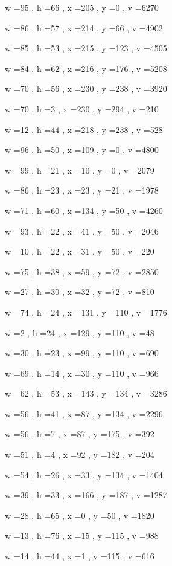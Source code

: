 \documentclass[11pt]{article}
\begin{document}
w =95 , h =66 , x =205 , y =0 , v =6270
\par
w =86 , h =57 , x =214 , y =66 , v =4902
\par
w =85 , h =53 , x =215 , y =123 , v =4505
\par
w =84 , h =62 , x =216 , y =176 , v =5208
\par
w =70 , h =56 , x =230 , y =238 , v =3920
\par
w =70 , h =3 , x =230 , y =294 , v =210
\par
w =12 , h =44 , x =218 , y =238 , v =528
\par
w =96 , h =50 , x =109 , y =0 , v =4800
\par
w =99 , h =21 , x =10 , y =0 , v =2079
\par
w =86 , h =23 , x =23 , y =21 , v =1978
\par
w =71 , h =60 , x =134 , y =50 , v =4260
\par
w =93 , h =22 , x =41 , y =50 , v =2046
\par
w =10 , h =22 , x =31 , y =50 , v =220
\par
w =75 , h =38 , x =59 , y =72 , v =2850
\par
w =27 , h =30 , x =32 , y =72 , v =810
\par
w =74 , h =24 , x =131 , y =110 , v =1776
\par
w =2 , h =24 , x =129 , y =110 , v =48
\par
w =30 , h =23 , x =99 , y =110 , v =690
\par
w =69 , h =14 , x =30 , y =110 , v =966
\par
w =62 , h =53 , x =143 , y =134 , v =3286
\par
w =56 , h =41 , x =87 , y =134 , v =2296
\par
w =56 , h =7 , x =87 , y =175 , v =392
\par
w =51 , h =4 , x =92 , y =182 , v =204
\par
w =54 , h =26 , x =33 , y =134 , v =1404
\par
w =39 , h =33 , x =166 , y =187 , v =1287
\par
w =28 , h =65 , x =0 , y =50 , v =1820
\par
w =13 , h =76 , x =15 , y =115 , v =988
\par
w =14 , h =44 , x =1 , y =115 , v =616
\par
\newpage
\end{document}
